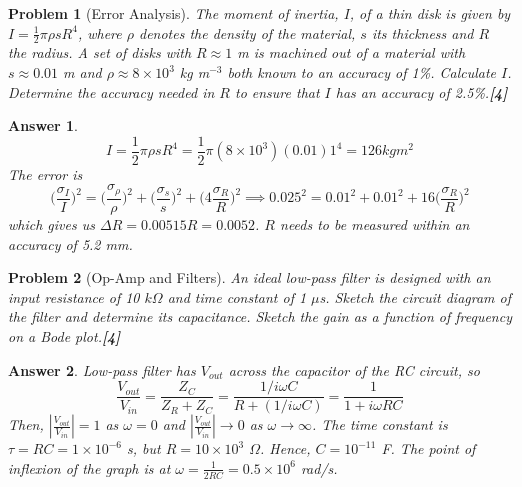 \documentclass[a4paper]{article}
\newtheorem{ans}{Answer}[subsection]
\theoremstyle{new}
\newtheorem{qns}{Problem}[subsection]
\begin{document}
\begin{qns}[Error Analysis]
The moment of inertia, $I$, of a thin disk is given by $I=\frac{1}{2}\pi\rho sR^4$, where $\rho$ denotes the density of the material, $s$ its thickness and $R$ the radius. A set of disks with $R\approx 1$ m is machined out of a material with $s\approx 0.01$ m and $\rho\approx 8\times10^3$ kg m$^{-3}$ both known to an accuracy of 1\%. Calculate $I$. Determine the accuracy needed in $R$ to ensure that $I$ has an accuracy of 2.5\%.\hfill\textbf{[4]}
\end{qns}
\begin{ans}
$$I=\frac{1}{2}\pi\rho sR^4=\frac{1}{2}\pi(8\times10^3)(0.01)1^4=126 kg m^2$$
The error is
$$\bigg(\frac{\sigma_I}{I}\bigg)^2=\bigg(\frac{\sigma_\rho}{\rho}\bigg)^2+\bigg(\frac{\sigma_s}{s}\bigg)^2+\bigg(4\frac{\sigma_R}{R}\bigg)^2\implies 0.025^2=0.01^2+0.01^2+16\bigg(\frac{\sigma_R}{R}\bigg)^2$$
which gives us $\Delta R=0.00515 R=0.0052$. $R$ needs to be measured within an accuracy of 5.2 mm.
\end{ans}
\begin{qns}[Op-Amp and Filters]
An ideal low-pass filter is designed with an input resistance of 10 $k\Omega$ and time constant of 1 $\mu$s. Sketch the circuit diagram of the filter and determine its capacitance. Sketch the gain as a function of frequency on a Bode plot.\hfill\textbf{[4]}
\end{qns}
\begin{ans}
Low-pass filter has $V_{out}$ across the capacitor of the RC circuit, so
$$\frac{V_{out}}{V_{in}}=\frac{Z_C}{Z_R+Z_C}=\frac{1/i\omega C}{R+(1/i\omega C)}=\frac{1}{1+i\omega RC}$$
Then, $|\frac{V_{out}}{V_{in}}|=1$ as $\omega=0$ and $|\frac{V_{out}}{V_{in}}|\rightarrow0$ as $\omega\rightarrow\infty$. The time constant is $\tau=RC=1\times10^{-6}$ s, but $R=10\times10^3$ $\Omega$. Hence, $C=10^{-11}$ F. The point of inflexion of the graph is at $\omega=\frac{1}{2RC}=0.5\times10^6$ rad/s.
\end{ans}
\newpage
\end{document}

